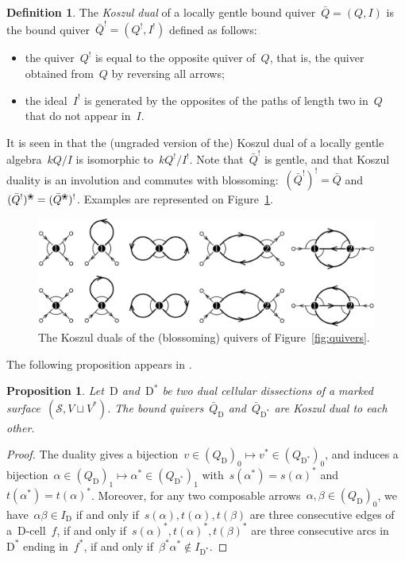 \documentclass{amsart}
\newtheorem{proposition}[theorem]{Proposition}
\theoremstyle{definition}
\newtheorem{definition}[theorem]{Definition}
\newcommand{\fref}[1]{Figure~\ref{#1}} %
\newcommand{\darkblue}{\color{darkblue}} %
\newcommand{\defn}[1]{\textsl{\darkblue #1}} %
\newcommand{\blossom}{^\text{\ding{96}}} %
\newcommand{\surface}{\mathcal{S}} %
\newcommand{\dual}{^*} %
\newcommand{\dissection}{\mathrm{D}} %
\newcommand{\koszul}{^!} %
\begin{document}
\begin{definition}
\label{defi:koszulDual}
The \defn{Koszul dual} of a locally gentle bound quiver~$\bar Q = (Q,I)$ is the bound quiver~$\bar Q\koszul = (Q\koszul, I\koszul)$ defined as follows:
\begin{itemize}
 \item the quiver~$Q\koszul$ is equal to the opposite quiver of~$Q$, that is, the quiver obtained from~$Q$ by reversing all arrows;
 \item the ideal~$I\koszul$ is generated by the opposites of the paths of length two in~$Q$ that do not appear in~$I$.
\end{itemize}
\end{definition}
It is seen in \cite{BessenrodtHolm} that the (ungraded version of the) Koszul dual of a locally gentle algebra~$kQ/I$ is isomorphic to~$kQ\koszul/I\koszul$.
Note that~$\bar Q\koszul$ is gentle, and that Koszul duality is an involution and commutes with blossoming:~$(\bar Q\koszul)\koszul = \bar Q$ and~$(\bar Q\koszul)\blossom = (\bar Q\blossom)\koszul$.
Examples are represented on \fref{fig:koszulQuivers}.

\begin{figure}[t]
	\capstart
	\centerline{\includegraphics[scale=.6]{koszulQuivers}}
	\caption{The Koszul duals of the (blossoming) quivers of \fref{fig:quivers}.}
	\label{fig:koszulQuivers}
\end{figure}

The following proposition appears in \cite[Proposition 1.25]{OpperPlamondonSchroll}.  

\begin{proposition}
\label{prop:dualityKoszul1}
Let~$\dissection$ and~$\dissection\dual$ be two dual cellular dissections of a marked surface~$(\surface, V\sqcup V\dual)$.
The bound quivers~$\bar Q_{\dissection}$ and~$\bar Q_{\dissection\dual}$ are Koszul dual to each other.
\end{proposition}

\begin{proof}
 The duality gives a bijection~$v\in (Q_\dissection)_0\mapsto v\dual\in (Q_{\dissection\dual})_0$, and induces a bijection~$\alpha\in (Q_\dissection)_1\mapsto \alpha\dual\in (Q_{\dissection\dual})_1$ with~$s(\alpha\dual)=s(\alpha)\dual$ and~$t(\alpha\dual)=t(\alpha)\dual$.
 Moreover, for any two composable arrows~$\alpha,\beta\in(Q_\dissection)_0$, we have~$\alpha\beta\in I_\dissection$ if and only if~$s(\alpha),t(\alpha),t(\beta)$ are three consecutive edges of a~$\dissection$-cell~$f$, if and only if~$s(\alpha)\dual,t(\alpha)\dual,t(\beta)\dual$ are three consecutive arcs in~$\dissection\dual$ ending in~$f\dual$, if and only if~$\beta\dual\alpha\dual\notin I_{\dissection\dual}$.
\end{proof}
\end{document}
